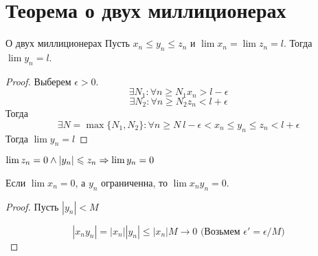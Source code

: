 ﻿\section{Теорема о двух миллиционерах}

\begin{theorem}{О двух миллиционерах}
Пусть $x_n \leqslant y_n \leqslant z_n$ и $\lim x_n = \lim z_n = l$. Тогда $\lim y_n = l$.
\end{theorem}
\begin{proof}
Выберем $\epsilon > 0$.
$$\exists N_1\colon\forall n \geqslant N_1 x_n > l - \epsilon$$
$$\exists N_2\colon\forall n \geqslant N_2 z_n < l + \epsilon$$
Тогда
$$\exists N = \max\{N_1,N_2\}\colon\forall n \geqslant N\:l - \epsilon < x_n \leqslant y_n \leqslant z_n < l + \epsilon$$
Тогда $\lim y_n = l$
\end{proof}
\begin{conseq}
$\lim z_n = 0 \land |y_n| \leqslant z_n \Rightarrow \lim y_n = 0$
\end{conseq}
\begin{conseq}
Если $\lim x_n = 0$, а $y_n$ ограниченна, то $\lim x_ny_n = 0$.
\end{conseq}
\begin{proof}
Пусть $|y_n| < M$

$$|x_n y_n| = |x_n||y_n| \le |x_n|M \to 0 \text{ (Возьмем $\epsilon' = \epsilon/M$)}$$ 
\end{proof}